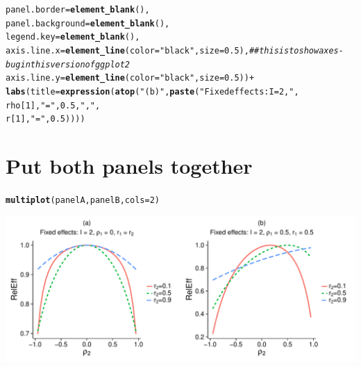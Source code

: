 \documentclass{article}\usepackage[]{graphicx}\usepackage[]{color}
\makeatletter
\def\maxwidth{ %
  \ifdim\Gin@nat@width>\linewidth
    \linewidth
  \else
    \Gin@nat@width
  \fi
}
\newcommand{\hlnum}[1]{\textcolor[rgb]{0.686,0.059,0.569}{#1}}%
\newcommand{\hlstr}[1]{\textcolor[rgb]{0.192,0.494,0.8}{#1}}%
\newcommand{\hlcom}[1]{\textcolor[rgb]{0.678,0.584,0.686}{\textit{#1}}}%
\newcommand{\hlopt}[1]{\textcolor[rgb]{0,0,0}{#1}}%
\newcommand{\hlstd}[1]{\textcolor[rgb]{0.345,0.345,0.345}{#1}}%
\newcommand{\hlkwc}[1]{\textcolor[rgb]{0.333,0.667,0.333}{#1}}%
\newcommand{\hlkwd}[1]{\textcolor[rgb]{0.737,0.353,0.396}{\textbf{#1}}}%
\newenvironment{kframe}{%
 \def\at@end@of@kframe{}%
 \ifinner\ifhmode%
  \def\at@end@of@kframe{\end{minipage}}%
  \begin{minipage}{\columnwidth}%
 \fi\fi%
 \def\FrameCommand##1{\hskip\@totalleftmargin \hskip-\fboxsep
 \colorbox{shadecolor}{##1}\hskip-\fboxsep
     \hskip-\linewidth \hskip-\@totalleftmargin \hskip\columnwidth}%
 \MakeFramed {\advance\hsize-\width
   \@totalleftmargin\z@ \linewidth\hsize
   \@setminipage}}%
 {\par\unskip\endMakeFramed%
 \at@end@of@kframe}
\newenvironment{knitrout}{}{} %
\makeatother
\begin{document}
\begin{knitrout}
\begin{kframe}
\begin{alltt}
        \hlkwc{panel.border} \hlstd{=} \hlkwd{element_blank}\hlstd{(),}
        \hlkwc{panel.background} \hlstd{=} \hlkwd{element_blank}\hlstd{(),}
        \hlkwc{legend.key} \hlstd{=} \hlkwd{element_blank}\hlstd{(),}
        \hlkwc{axis.line.x} \hlstd{=} \hlkwd{element_line}\hlstd{(}\hlkwc{color}\hlstd{=}\hlstr{"black"}\hlstd{,} \hlkwc{size} \hlstd{=} \hlnum{0.5}\hlstd{),} \hlcom{##this is to show axes - bug in this version of ggplot2}
        \hlkwc{axis.line.y} \hlstd{=} \hlkwd{element_line}\hlstd{(}\hlkwc{color}\hlstd{=}\hlstr{"black"}\hlstd{,} \hlkwc{size} \hlstd{=} \hlnum{0.5}\hlstd{))} \hlopt{+}
  \hlkwd{labs}\hlstd{(}\hlkwc{title}\hlstd{=}\hlkwd{expression}\hlstd{(}\hlkwd{atop}\hlstd{(}\hlstr{"(b)"}\hlstd{,} \hlkwd{paste}\hlstd{(}\hlstr{"Fixed effects: I = 2, "}\hlstd{,}
                                          \hlstd{rho[}\hlnum{1}\hlstd{],} \hlstr{" = "}\hlstd{,} \hlnum{0.5}\hlstd{,} \hlstr{", "}\hlstd{,}
                                          \hlstd{r[}\hlnum{1}\hlstd{],} \hlstr{" = "}\hlstd{,} \hlnum{0.5}\hlstd{))))}
\end{alltt}
\end{kframe}
\end{knitrout}

\section{Put both panels together}

\begin{knitrout}
\color{fgcolor}\begin{kframe}
\begin{alltt}
\hlkwd{multiplot}\hlstd{(panelA, panelB,} \hlkwc{cols}\hlstd{=}\hlnum{2}\hlstd{)}
\end{alltt}


{\ttfamily\noindent\itshape\color{messagecolor}{\#\# Loading required package: grid}}\end{kframe}

{\centering \includegraphics[width=\maxwidth]{figures/Figure_S2_panels_ab-1} 

}



\end{knitrout}
\end{document}
